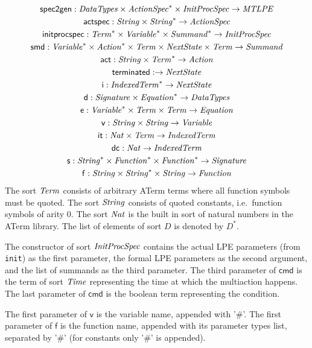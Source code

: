 \documentclass[fleqn,a4paper,dvips]{article}
\newcommand{\aterm}[1]{\mathsf{#1}}
\newcommand{\afunc}[3]{\aterm{#1}:#2\rightarrow#3}
\begin{document}
{\begin{gather*}
\afunc{spec2gen}{\nm{DataTypes}\x\nm{ActionSpec}^*\x\nm{InitProcSpec}}{\nm{MTLPE}}\\
\afunc{actspec}{\nm{String}\x\nm{String}^*}{\nm{ActionSpec}}\\
\afunc{initprocspec}{\nm{Term}^*\x\nm{Variable}^*\x\nm{Summand}^*}{\nm{InitProcSpec}}\\
\afunc{smd}{\nm{Variable}^*\x\nm{Action}^*\x\nm{Term}\x\nm{NextState}\x\nm{Term}}{\nm{Summand}}\\
\afunc{act}{\nm{String}\x\nm{Term}^*}{\nm{Action}}\\
\afunc{terminated}{}{\nm{NextState}}\\
\afunc{i}{\nm{IndexedTerm}^*}{\nm{NextState}}\\
\afunc{d}{\nm{Signature}\x\nm{Equation}^*}{\nm{DataTypes}}\\
\afunc{e}{\nm{Variable}^*\x\nm{Term}\x\nm{Term}}{\nm{Equation}}\\
\afunc{v}{\nm{String}\x\nm{String}}{\nm{Variable}}\\
\afunc{it}{\Nat\x\nm{Term}}{\nm{IndexedTerm}}\\
\afunc{dc}{\Nat}{\nm{IndexedTerm}}\\
\afunc{s}{\nm{String}^*\x\nm{Function}^*\x\nm{Function}^*}{\nm{Signature}}\\
\afunc{f}{\nm{String}\x\nm{String}^{*}\x\nm{String}}{\nm{Function}}
\end{gather*}
The sort $\mathit{Term}$ consists of arbitrary ATerm terms where all function
symbols must be quoted. The sort $\mathit{String}$ consists of quoted constants,
i.e.\ function symbols of arity 0. The sort $\mathit{Nat}$ is the built in
sort of natural numbers in the ATerm library. The list
of elements of sort $D$ is denoted by $D^{*}$.

The constructor of sort $\mathit{InitProcSpec}$ contains the actual LPE
parameters (from \texttt{init}) as the first parameter, the formal LPE
parameters as the second argument, and the list of summands as the
third parameter. The third parameter of $\mathsf{cmd}$ is the term of
sort $\mathit{Time}$ representing the time at which the multiaction
happens.  The last parameter of $\mathsf{cmd}$ is the boolean term
representing the condition.

The first parameter of $\mathsf{v}$ is the variable name, appended with '\#'.
The first parameter of $\mathsf{f}$ is the function name, appended 
with its parameter types list, separated by '\#' (for constants only '\#' is appended).

}
\end{document}
